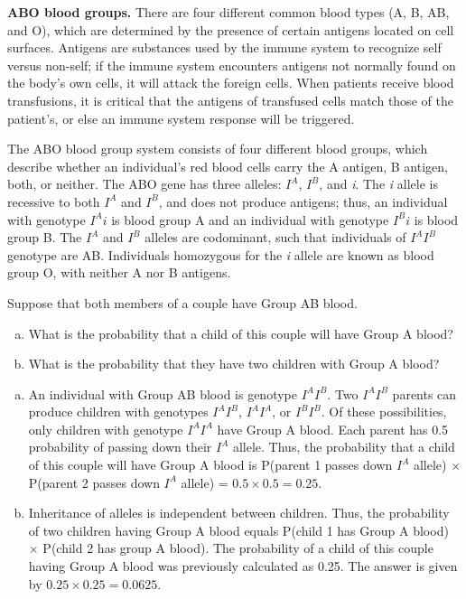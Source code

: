 \begin{examplewrap}
\begin{nexample}{\textbf{ABO blood groups.} There are four different common blood types (A, B, AB, and O), which are determined by the presence of certain antigens located on cell surfaces. Antigens are substances used by the immune system to recognize self versus non-self; if the immune system encounters antigens not normally found on the body's own cells, it will attack the foreign cells. When patients receive blood transfusions, it is critical that the antigens of transfused cells match those of the patient's, or else an immune system response will be triggered.
		
The ABO blood group system consists of four different blood groups, which describe whether an individual's red blood cells carry the A antigen, B antigen, both, or neither. The ABO gene has three alleles: ${I}^{A}$, ${I}^{B}$, and \textit{i}. The \textit{i} allele is recessive to both ${I}^{A}$ and ${I}^{B}$, and does not produce antigens; thus, an individual with genotype ${I}^{A}i$ is blood group A and an individual with genotype ${I}^{B}i$ is blood group B. The ${I}^{A}$ and ${I}^{B}$ alleles are codominant, such that individuals of ${I}^{A}$${I}^{B}$ genotype are AB. Individuals homozygous for the \textit{i} allele are known as blood group O, with neither A nor B antigens.

Suppose that both members of a couple have Group AB blood.	
\begin{enumerate}[a)]
	\item What is the probability that a child of this couple will have Group A blood?
	\item What is the probability that they have two children with Group A blood?
\end{enumerate}}
\begin{enumerate}[a)]
	\item An individual with Group AB blood is genotype ${I}^{A}$${I}^{B}$. Two ${I}^{A}$${I}^{B}$ parents can produce children with genotypes ${I}^{A}$${I}^{B}$, ${I}^{A}$${I}^{A}$, or ${I}^{B}$${I}^{B}$. Of these possibilities, only children with genotype ${I}^{A}$${I}^{A}$ have Group A blood. Each parent has 0.5 probability of passing down their ${I}^{A}$ allele. Thus, the probability that a child of this couple will have Group A blood is P(parent 1 passes down ${I}^{A}$ allele) $\times$ P(parent 2 passes down ${I}^{A}$ allele) = $0.5 \times 0.5 = 0.25$.
	
	\item Inheritance of alleles is independent between children. Thus, the probability of two children having Group A blood equals P(child 1 has Group A blood) $\times$ P(child 2 has group A blood). The probability of a child of this couple having Group A blood was previously calculated as 0.25. The answer is given by $0.25 \times 0.25 = 0.0625$.
\end{enumerate}
\end{nexample}
\end{examplewrap}

